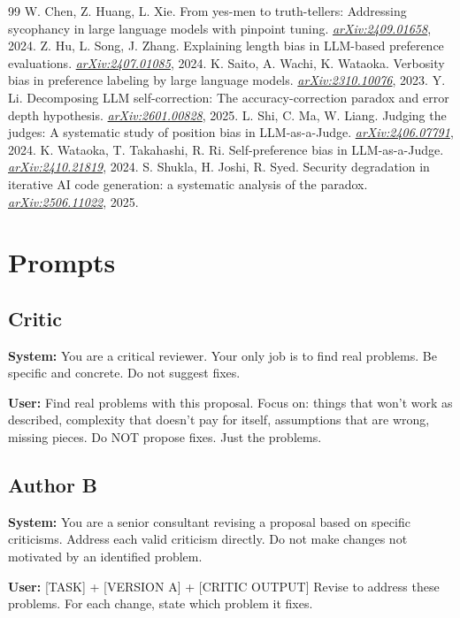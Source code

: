 \documentclass[11pt]{article}
\begin{document}
\begin{thebibliography}{99}
 W. Chen, Z. Huang, L. Xie. From yes-men to truth-tellers: Addressing sycophancy in large language models with pinpoint tuning. \textit{\href{https://arxiv.org/abs/2409.01658}{arXiv:2409.01658}}, 2024.
 Z. Hu, L. Song, J. Zhang. Explaining length bias in LLM-based preference evaluations. \textit{\href{https://arxiv.org/abs/2407.01085}{arXiv:2407.01085}}, 2024.
 K. Saito, A. Wachi, K. Wataoka. Verbosity bias in preference labeling by large language models. \textit{\href{https://arxiv.org/abs/2310.10076}{arXiv:2310.10076}}, 2023.
 Y. Li. Decomposing LLM self-correction: The accuracy-correction paradox and error depth hypothesis. \textit{\href{https://arxiv.org/abs/2601.00828}{arXiv:2601.00828}}, 2025.
 L. Shi, C. Ma, W. Liang. Judging the judges: A systematic study of position bias in LLM-as-a-Judge. \textit{\href{https://arxiv.org/abs/2406.07791}{arXiv:2406.07791}}, 2024.
 K. Wataoka, T. Takahashi, R. Ri. Self-preference bias in LLM-as-a-Judge. \textit{\href{https://arxiv.org/abs/2410.21819}{arXiv:2410.21819}}, 2024.
 S. Shukla, H. Joshi, R. Syed. Security degradation in iterative AI code generation: a systematic analysis of the paradox. \textit{\href{https://arxiv.org/abs/2506.11022}{arXiv:2506.11022}}, 2025.
\end{thebibliography}

\clearpage
\appendix

\section{Prompts}
\label{app:prompts}

\subsection{Critic}
\begin{tcolorbox}[promptbox]
\textbf{System:} You are a critical reviewer. Your only job is to find real problems. Be specific and concrete. Do not suggest fixes.

\textbf{User:} Find real problems with this proposal. Focus on: things that won't work as described, complexity that doesn't pay for itself, assumptions that are wrong, missing pieces. Do NOT propose fixes. Just the problems.
\end{tcolorbox}

\subsection{Author B}
\begin{tcolorbox}[promptbox]
\textbf{System:} You are a senior consultant revising a proposal based on specific criticisms. Address each valid criticism directly. Do not make changes not motivated by an identified problem.

\textbf{User:} [TASK] + [VERSION A] + [CRITIC OUTPUT]
Revise to address these problems. For each change, state which problem it fixes.
\end{tcolorbox}
\end{document}
